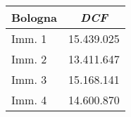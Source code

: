\begin{tabular}[c]{|l||c|}
\hline
{\bfseries Bologna} & {\bfseries \textit{DCF}} \\
\hline \hline
Imm. 1 & 15.439.025 \\
\hline
Imm. 2 & 13.411.647 \\
\hline
Imm. 3 & 15.168.141 \\
\hline
Imm. 4 & 14.600.870 \\
\hline
\end{tabular} 